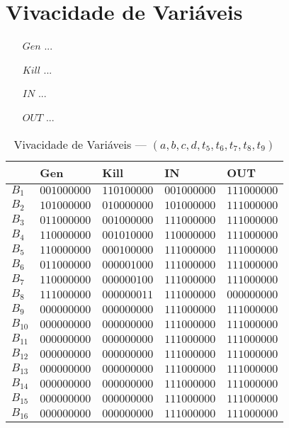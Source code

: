 \section{Vivacidade de Vari\'aveis}

\begin{itemize}
  \item[$Gen$] ...
  \item[$Kill$] ...
  \item[$IN$] ...
  \item[$OUT$] ...
\end{itemize}



\begin{table}[ht]
\centering
\begin{tabular}{l|l|l|l|l}
	& Gen & Kill & IN & OUT\\
\hline
$B_{1}$ &  $001000000$ & $110100000$ & $001000000$ & $111000000$\\
$B_{2}$ &  $101000000$ & $010000000$ & $101000000$ & $111000000$\\
$B_{3}$ &  $011000000$ & $001000000$ & $111000000$ & $111000000$\\
$B_{4}$ &  $110000000$ & $001010000$ & $110000000$ & $111000000$\\
$B_{5}$ &  $110000000$ & $000100000$ & $111000000$ & $111000000$\\
$B_{6}$ &  $011000000$ & $000001000$ & $111000000$ & $111000000$\\
$B_{7}$ &  $110000000$ & $000000100$ & $111000000$ & $111000000$\\
$B_{8}$ &  $111000000$ & $000000011$ & $111000000$ & $000000000$\\
$B_{9}$ &  $000000000$ & $000000000$ & $111000000$ & $111000000$\\
$B_{10}$ &  $000000000$ & $000000000$ & $111000000$ & $111000000$\\
$B_{11}$ &  $000000000$ & $000000000$ & $111000000$ & $111000000$\\
$B_{12}$ &  $000000000$ & $000000000$ & $111000000$ & $111000000$\\
$B_{13}$ &  $000000000$ & $000000000$ & $111000000$ & $111000000$\\
$B_{14}$ &  $000000000$ & $000000000$ & $111000000$ & $111000000$\\
$B_{15}$ &  $000000000$ & $000000000$ & $111000000$ & $111000000$\\
$B_{16}$ &  $000000000$ & $000000000$ & $111000000$ & $111000000$\\
\end{tabular}
\caption{Vivacidade de Vari\'aveis --- $(a, b, c, d, t_{5}, t_{6}, t_{7}, t_{8}, t_{9})$}
\end{table}

